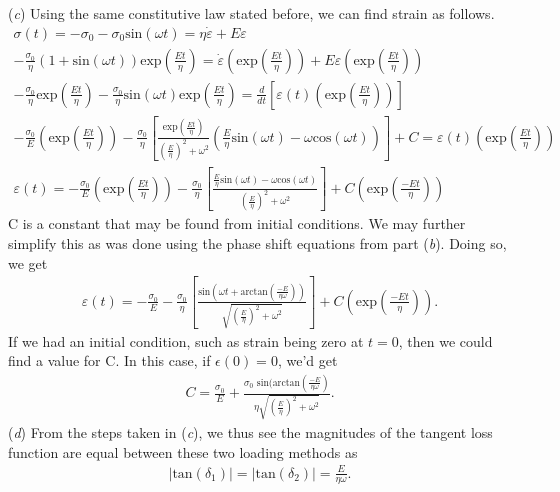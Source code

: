 (\textit{c}) Using the same constitutive law stated before, we can find strain as follows.
\begin{gather*}
    \sigma(t)=-\sigma_0-\sigma_0\text{sin}(\omega t)=\eta\dot{\varepsilon}+E\varepsilon\\
    -\frac{\sigma_0}{\eta}(1+\text{sin}(\omega t))\text{exp}(\frac{Et}{\eta})=\dot{\varepsilon}(\text{exp}(\frac{Et}{\eta}))+E\varepsilon(\text{exp}(\frac{Et}{\eta}))\\
    -\frac{\sigma_0}{\eta}\text{exp}(\frac{Et}{\eta})-\frac{\sigma_0}{\eta}\text{sin}(\omega t)\text{exp}(\frac{Et}{\eta})=\frac{d}{dt}[\varepsilon(t)(\text{exp}(\frac{Et}{\eta}))]\\
    -\frac{\sigma_0}{E}(\text{exp}(\frac{Et}{\eta}))-\frac{\sigma_0}{\eta}[\frac{\text{exp}(\frac{Et}{\eta})}{(\frac{E}{\eta})^2+\omega^2}(\frac{E}{\eta}\text{sin}(\omega t)-\omega\text{cos}(\omega t))]+C=\varepsilon(t)(\text{exp}(\frac{Et}{\eta}))\\
    \varepsilon(t)=-\frac{\sigma_0}{E}(\text{exp}(\frac{Et}{\eta}))-\frac{\sigma_0}{\eta}[\frac{\frac{E}{\eta}\text{sin}(\omega t)-\omega\text{cos}(\omega t)}{(\frac{E}{\eta})^2+\omega^2}]+C(\text{exp}(\frac{-Et}{\eta}))
\end{gather*}
C is a constant that may be found from initial conditions. We may further simplify this as was done using the phase shift equations from part (\textit{b}). Doing so, we get
\begin{gather*}
    \varepsilon(t)=-\frac{\sigma_0}{E}-\frac{\sigma_0}{\eta}[\frac{\text{sin}(\omega t+\text{arctan}(\frac{-E}{\eta\omega}))}{\sqrt{(\frac{E}{\eta})^2+\omega^2}}]+C(\text{exp}(\frac{-Et}{\eta})).
\end{gather*}
If we had an initial condition, such as strain being zero at $t=0$, then we could find a value for C. In this case, if $\epsilon(0)=0$, we'd get
\begin{gather*}
    C=\frac{\sigma_0}{E}+\frac{\sigma_0\text{ sin(arctan}(\frac{-E}{\eta\omega})}{\eta\sqrt{(\frac{E}{\eta})^2+\omega^2}}.
\end{gather*}
(\textit{d}) From the steps taken in (\textit{c}), we thus see the magnitudes of the tangent loss function are equal between these two loading methods as
\begin{gather*}
    |\text{tan}(\delta_1)|=|\text{tan}(\delta_2)|=\frac{E}{\eta\omega}.
\end{gather*}